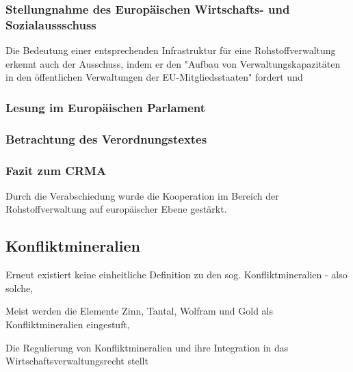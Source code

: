 \documentclass[12pt,a4paper,oneside]{book} %
\begin{document}
	\subsubsection{Stellungnahme des Europäischen Wirtschafts- und Sozialaussschuss}
	
	Die Bedeutung einer entsprechenden Infrastruktur für eine Rohstoffverwaltung erkennt auch der Ausschuss, indem er den "Aufbau von Verwaltungskapazitäten in den öffentlichen Verwaltungen der EU-Mitgliedsstaaten" fordert %
	und 
	
	\subsubsection{Lesung im Europäischen Parlament}
	
	
	\subsubsection{Betrachtung des Verordnungstextes}
	
	\subsubsection{Fazit zum CRMA}
	Durch die Verabschiedung wurde die Kooperation im Bereich der Rohstoffverwaltung auf europäischer Ebene gestärkt.
	
	\subsection{Konfliktmineralien}
	Erneut existiert keine einheitliche Definition zu den sog. Konfliktmineralien - also solche, 
	
	Meist werden die Elemente Zinn, Tantal, Wolfram und Gold als Konfliktmineralien eingestuft, 
	
	Die Regulierung von Konfliktmineralien und ihre Integration in das Wirtschaftsverwaltungsrecht stellt 
	
\end{document}

